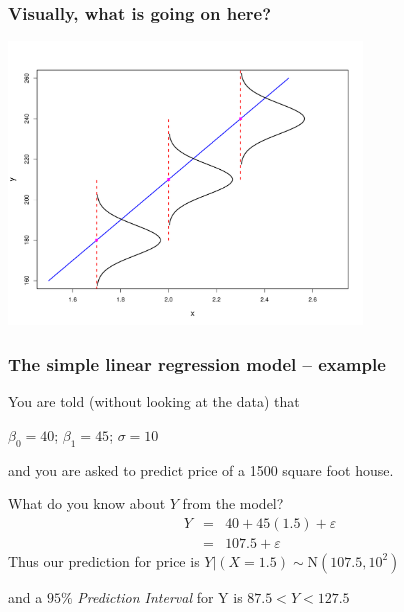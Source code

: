 \documentclass{beamer}
\newcommand{\bl}{\color{lightblue}}
\newcommand{\rd}{\color{burntorange}}
\newcommand{\bk}{\color{black}}
\newcommand{\mr}[1]{\mathrm{#1}}
\newcommand{\sk}{\vspace{.5cm}}
\begin{document}

\begin{frame}
\frametitle{Visually, what is going on here?} 




\begin{center}
\includegraphics[width=3.7in]{figures/norm-cond-dist.pdf}
\end{center}


%
%

\end{frame}

\begin{frame}
\frametitle{The simple linear regression model -- example}

You are told (without looking at the data) that
\begin{center}
$\beta_0 = 40$; $\beta_1= 45$; $\sigma = 10$ 
\end{center}
and you are asked to
predict price of a 1500 square foot house.  

\sk
What do you know about $Y$ from the model?
\begin{eqnarray*}
Y &=& 40 + 45(1.5) + \varepsilon\\
&=& 107.5 + \varepsilon
\end{eqnarray*}
Thus \bl our prediction for price is \rd
$Y | (X=1.5)\sim \mr{N}(107.5, 10^2)$


\bk
and a $95\%$ {\it Prediction Interval} for Y is  \rd  $87.5 < Y < 127.5$

\end{frame}
\end{document}
